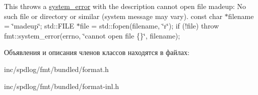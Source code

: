 This throws a \hyperlink{classsystem__error}{system\+\_\+error} with the description cannot open file \textquotesingle{}madeup\textquotesingle{}\+: No such file or directory or similar (system message may vary). const char $\ast$filename = \char`\"{}madeup\char`\"{}; std\+::\+F\+I\+LE $\ast$file = std\+::fopen(filename, \char`\"{}r\char`\"{}); if (!file) throw fmt\+::system\+\_\+error(errno, \char`\"{}cannot open file \textquotesingle{}\{\}\textquotesingle{}\char`\"{}, filename);  

Объявления и описания членов классов находятся в файлах\+:\begin{DoxyCompactItemize}
\item 
inc/spdlog/fmt/bundled/format.\+h\item 
inc/spdlog/fmt/bundled/format-\/inl.\+h\end{DoxyCompactItemize}
